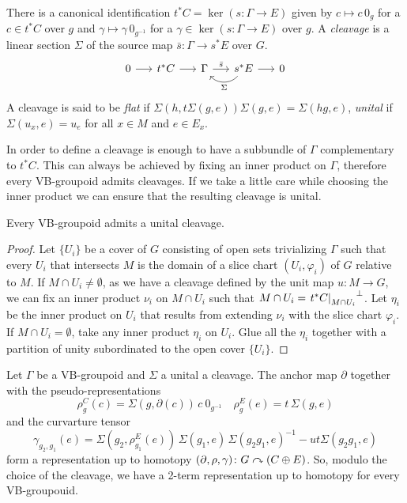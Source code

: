 %
%

There is a canonical identification $t^*C = \ker(s\colon\Gamma\to E)$ given by $c\mapsto c\, 0_g$ for a $c\in t^*C$ over $g$ and $\gamma\mapsto\gamma\, 0_{g^{-1}}$ for a $\gamma\in\ker(s\colon\Gamma\to E)$ over $g$.
A \emph{cleavage} is a linear section $\Sigma$ of the source map $\bar s\colon\Gamma\to s^*E$ over $G$.
\begin{equation}
  \begin{tikzcd}[column sep=1.5em, row sep=small]
    0 \ar{r} & t^*C \ar{r} & \Gamma \ar{r}{\bar s} & s^*E \ar{r} \ar[bend left = 50]{l}{\Sigma} & 0
  \end{tikzcd}
\end{equation}
A cleavage is said to be \emph{flat} if $\Sigma(h, t\Sigma(g, e))\Sigma(g, e) = \Sigma(hg, e)$, \emph{unital} if $\Sigma(u_x, e) = u_e$ for all $x\in M$ and $e\in E_x$.

In order to define a cleavage is enough to have a subbundle of $\Gamma$ complementary to $t^*C$.
This can always be achieved by fixing an inner product on $\Gamma$, therefore every VB-groupoid admits cleavages.
If we take a little care while choosing the inner product we can ensure that the resulting cleavage is unital.
%
\begin{lemma}
Every VB-groupoid admits a unital cleavage.
\end{lemma}

\begin{proof}
Let $\{U_i\}$ be a cover of $G$ consisting of open sets trivializing $\Gamma$ such that every $U_i$ that intersects $M$ is the domain of a slice chart $(U_i, \varphi_i)$ of $G$ relative to $M$.
If $M\cap U_i \neq \emptyset$, as we have a cleavage defined by the unit map $u\colon M\to G$, we can fix an inner product $\nu_i$ on $M\cap U_i$ such that $M\cap U_i = {\left.t^*C\right|_{M\cap U_i}}^\perp$.
Let $\eta_i$ be the inner product on $U_i$ that results from extending $\nu_i$ with the slice chart $\varphi_i$.
If $M\cap U_i = \emptyset$, take any inner product $\eta_i$ on $U_i$.
Glue all the $\eta_i$ together with a partition of unity subordinated to the open cover $\{U_i\}$.
\end{proof}

Let $\Gamma$ be a VB-groupoid and $\Sigma$ a unital a cleavage.
The anchor map $\partial$ together with the pseudo-representations
\[ \rho^C_g(c) = \Sigma(g, \partial(c)) \, c \: 0_{g^{-1}} \quad \rho^E_g(e) = t \, \Sigma(g, e) \]
and the curvarture tensor
\[ \gamma_{g_2, g_1}(e) = \Sigma(g_2, \rho_{g_1}^E(e)) \, \Sigma(g_1, e) \, \Sigma(g_2g_1, e)^{-1} - ut\Sigma(g_2g_1, e) \]
form a representation up to homotopy $(\partial, \rho, \gamma)\colon G\curvearrowright(C\oplus E)$.
So, modulo the choice of the cleavage, we have a 2-term representation up to homotopy for every VB-groupouid.
\smallskip

